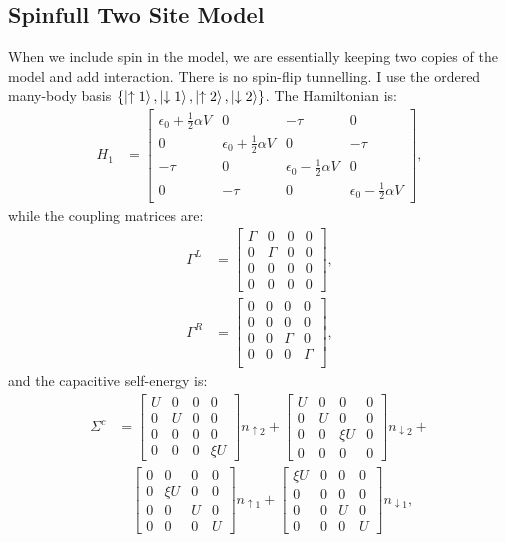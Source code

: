 \subsection{Spinfull Two Site Model}
When we include spin in the model, we are essentially keeping two copies of the model and add interaction. There is no spin-flip tunnelling. I use the ordered many-body basis $\left\{ \ket{\uparrow 1}, \ket{\downarrow 1}, \ket{\uparrow 2}, \ket{\downarrow 2}\right\}$. The Hamiltonian is:
\begin{align}
H_1 &= \begin{bmatrix} \epsilon_0 + \frac{1}{2} \alpha V & 0 & -\tau & 0 \\ 0 & \epsilon_0 + \frac{1}{2} \alpha V & 0 & -\tau\\ -\tau & 0 & \epsilon_0 - \frac{1}{2} \alpha V & 0 \\ 0 & -\tau & 0 & \epsilon_0 - \frac{1}{2} \alpha V\end{bmatrix},
\label{eq:spinfullhamiltonian}
\end{align} 
while the coupling matrices are:
\begin{align*}
\Gamma^L &= \begin{bmatrix} \Gamma & 0 & 0 & 0 \\ 0 & \Gamma & 0 & 0 \\ 0 & 0 & 0 & 0 \\  0 & 0 & 0 & 0\end{bmatrix},\\ \Gamma^R &= \begin{bmatrix} 0 & 0 & 0 & 0 \\ 0 & 0 & 0 & 0 \\ 0 & 0 & \Gamma & 0 \\ 0 & 0 & 0 & \Gamma \\ \end{bmatrix},
\end{align*}
and the capacitive self-energy is:
\begin{align*}
\Sigma^c &= \begin{bmatrix} U & 0 & 0 & 0\\ 0 & U & 0 & 0\\ 0 & 0 & 0 & 0\\ 0 & 0 & 0 & \xi U \end{bmatrix} n_{\uparrow 2} + \begin{bmatrix} U & 0 & 0 & 0\\ 0 & U & 0 & 0\\ 0 & 0 & \xi U & 0\\ 0 & 0 & 0 & 0 \end{bmatrix} n_{\downarrow 2} +\\
&\quad\begin{bmatrix} 0 & 0 & 0 & 0\\ 0 & \xi  U & 0 & 0\\ 0 & 0 & U & 0\\ 0 & 0 & 0 & U \end{bmatrix} n_{\uparrow 1} + \begin{bmatrix} \xi  U & 0 & 0 & 0\\ 0 & 0 & 0 & 0\\ 0 & 0 & U & 0\\ 0 & 0 & 0 & U \end{bmatrix} n_{\downarrow 1},
\end{align*}
